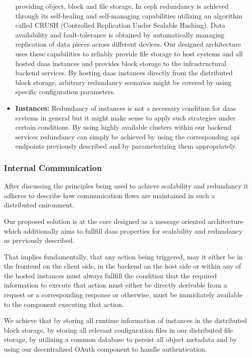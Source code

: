 \documentclass[runningheads]{llncs}
\begin{document}
\begin{itemize}
	      providing object, block and file storage. In ceph redundancy is achieved
	      through its self-healing and self-managing capabilities utilizing an algorithm
	      called CRUSH (Controlled Replication Under Scalable Hashing).
	      Data availability and fault-tolerance is obtained
	      by automatically managing replication
	      of data pieces across different devices.
	      Our designed architecture uses these capabilities
	      to reliably provide
	      file storage to host systems and all hosted daas instances
	      and provides block storage to the infrastructural backend services.
	      By hosting daas instances directly from the distributed block storage,
	      arbitrary redundancy scenarios might be covered
	      by using specific configuration parameters.
	\item \textbf{Instances: } Redundancy of instances
	      is not a necessary condition for daas systems in general
	      but it might make sense to apply such strategies under certain conditions.
	      By using highly available clusters within our backend services
	      redundancy can simply be achieved by using the corresponding api endpoints
	      previously described and by parameterizing them appropriately.
\end{itemize}

\subsubsection{Internal Communication}
After discussing the principles being used to achieve scalability and redundancy
it adheres to describe how communication flows are maintained
in such a distributed enironment.

Our proposed solution is at the core designed
as a message oriented architecture
which additionally aims to fullfill daas properties
for scalability and redundancy as previously described.

That implies fundamentally, that any action being triggered,
may it either be in the frontend on the client side,
in the backend on the host side
or within any of the hosted instances
must always fullfill the condition that the required information to execute that action
must either be directly derivable from a request or a corresponding response
or otherwise, must be immidiately available to the component executing that action.

We achieve that by storing all runtime information of instances in the distributed block storage,
by storing all relevant configuration files in our distributed file storage,
by utilizing a common database to persist all object metadata
and by using our decentralized OAuth component to handle authentication.
\end{document}
